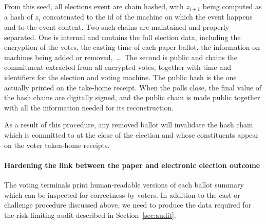 
From this seed, all elections event are chain hashed, with $z_{i+1}$
being computed as a hash of $z_i$ concatenated to the id of the
machine on which the event happens and to the event content. Two such
chains are maintained and properly separated. One is internal and
contains the full election data, including the encryption of the
votes, the casting time of each paper ballot, the information on
machines being added or removed,~\dots\ The second is public and
chains the commitment extracted from all encrypted votes, together
with time and identifiers for the election and voting machine. The
public hash is the one actually printed on the take-home receipt. When
the polls close, the final value of the hash chains are digitally
signed, and the public chain is made public together with all the
information needed for its reconstruction. 

As a result of this procedure, any removed ballot will
invalidate the hash chain which is committed to at the close of the
election and whose constituents appear on the voter taken-home receipts.

\paragraph{Hardening the link between the paper and electronic
  election outcome}
\label{sec:hard-link-betw}

\newcommand{\bid}{\ensuremath{{bid}}\xspace}
\newcommand{\bcid}{\ensuremath{{bcid}}\xspace}

The voting terminals print human-readable versions of each ballot
summary which can be inspected for correctness by voters.  In addition
to the cast or challenge procedure discussed above, we need to produce
the data required for the risk-limiting audit described in
Section~\ref{sec:audit}.

